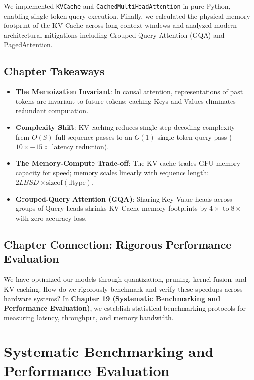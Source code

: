 \documentclass[
  letterpaper,
]{scrbook}
\providecommand{\tightlist}{%
  \setlength{\itemsep}{0pt}\setlength{\parskip}{0pt}}
\begin{document}
We implemented \texttt{KVCache} and \texttt{CachedMultiHeadAttention} in
pure Python, enabling single-token query execution. Finally, we
calculated the physical memory footprint of the KV Cache across long
context windows and analyzed modern architectural mitigations including
Grouped-Query Attention (GQA) and PagedAttention.

\section{Chapter Takeaways}\label{chapter-takeaways-18}

\begin{itemize}
\tightlist
\item
  \textbf{The Memoization Invariant}: In causal attention,
  representations of past tokens are invariant to future tokens; caching
  Keys and Values eliminates redundant computation.
\item
  \textbf{Complexity Shift}: KV caching reduces single-step decoding
  complexity from \(O(S)\) full-sequence passes to an \(O(1)\)
  single-token query pass (\(10\times - 15\times\) latency reduction).
\item
  \textbf{The Memory-Compute Trade-off}: The KV cache trades GPU memory
  capacity for speed; memory scales linearly with sequence length:
  \(2 L B S D \times \text{sizeof}(\text{dtype})\).
\item
  \textbf{Grouped-Query Attention (GQA)}: Sharing Key-Value heads across
  groups of Query heads shrinks KV Cache memory footprints by
  \(4\times\) to \(8\times\) with zero accuracy loss.
\end{itemize}

\section{Chapter Connection: Rigorous Performance
Evaluation}\label{chapter-connection-rigorous-performance-evaluation}

We have optimized our models through quantization, pruning, kernel
fusion, and KV caching. How do we rigorously benchmark and verify these
speedups across hardware systems? In \textbf{Chapter 19 (Systematic
Benchmarking and Performance Evaluation)}, we establish statistical
benchmarking protocols for measuring latency, throughput, and memory
bandwidth.

\chapter{Systematic Benchmarking and Performance
Evaluation}\label{systematic-benchmarking-and-performance-evaluation}
\end{document}
